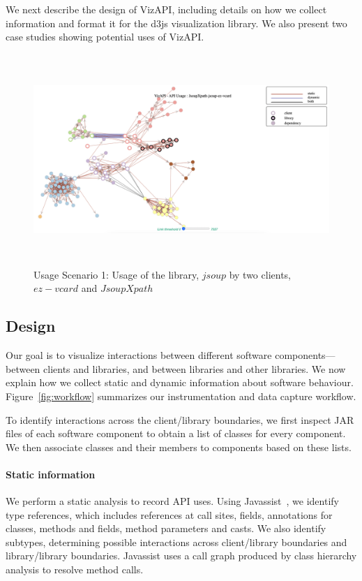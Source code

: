 \label{sec:viz-api}

We next describe the design of VizAPI, including details on how we
collect information and format it for the d3js visualization
library. We also present two case studies showing potential uses of
VizAPI.

\begin{figure}[h]
\begin{center}
\includegraphics[scale=1,width=15cm,height=8cm]{images/usage-scenario1.png}
\caption{Usage Scenario 1: Usage of the library, $jsoup$ by two clients, $ez-vcard$  and $JsoupXpath$}
\label{fig:usagescenario1}
\end{center}
\end{figure}

\subsection{Design}
\label{subsec:collecting-data}
Our goal is to visualize interactions between different software components---between
clients and libraries, and between libraries and other libraries. We now explain
how we collect static and dynamic information about software behaviour.
Figure~\ref{fig:workflow} summarizes our instrumentation and
data capture workflow. 

To identify interactions across the client/library boundaries,
we first inspect JAR files of each software component to obtain a list of
classes for every component. We then associate classes and their members to
components based on these lists.

\paragraph{Static information} We perform a static analysis to record
API uses. Using Javassist~\cite{chiba00:_load_struc_reflec_java}, we identify type
references, which includes references at call sites, fields, annotations for 
classes, methods and fields, method parameters and casts. 
We also identify subtypes, determining possible 
interactions across client/library boundaries and library/library boundaries.
Javassist uses
a call graph produced by class hierarchy analysis to resolve method calls.

